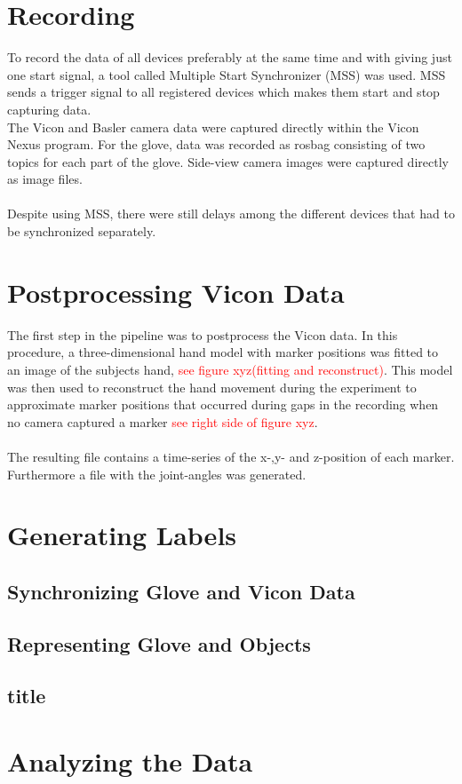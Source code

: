 \section{Recording}
To record the data of all devices preferably at the same time and with giving just one start signal, a tool called Multiple Start Synchronizer (MSS) was used. MSS sends a trigger signal to all registered devices which makes them start and stop capturing data.\\
The Vicon and Basler camera data were captured directly within the Vicon Nexus program. For the glove, data was recorded as rosbag consisting of two topics for each part of the glove. Side-view camera images were captured directly as image files.\\
\\
Despite using MSS, there were still delays among the different devices that had to be synchronized separately. 
\section{Postprocessing Vicon Data}
The first step in the pipeline was to postprocess the Vicon data. In this procedure, a three-dimensional hand model with marker positions was fitted to an image of the subjects hand, \textcolor{red}{see figure xyz(fitting and reconstruct)}. This model was then used to reconstruct the hand movement during the experiment to approximate marker positions that occurred during gaps in the recording when no camera captured a marker \textcolor{red}{see right side of figure xyz}.\\
\\
The resulting file contains a time-series of the x-,y- and z-position of each marker. Furthermore a file with the joint-angles was generated.
\section{Generating Labels}

\subsection{Synchronizing Glove and Vicon Data}
\subsection{Representing Glove and Objects}
\subsection{title}

\section{Analyzing the Data}
